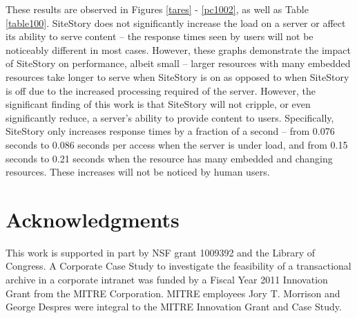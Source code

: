 \documentclass[runningheads,a4paper]{llncs}
\begin{document}
These results are observed in Figures \ref{tares} - \ref{pc1002}, as well as Table \ref{table100}. SiteStory does not significantly increase the load on a server or affect its ability to serve content -- the response times seen by users will not be noticeably different in most cases. However, these graphs demonstrate the impact of SiteStory on performance, albeit small -- larger resources with many embedded resources take longer to serve when SiteStory is on as opposed to when SiteStory is off due to the increased processing required of the server. However, the significant finding of this work is that SiteStory will not cripple, or even significantly reduce, a server's ability to provide content to users. Specifically, SiteStory only increases response times by a fraction of a second -- from 0.076 seconds to 0.086 seconds per access when the server is under load, and from 0.15 seconds to 0.21 seconds when the resource has many embedded and changing resources. These increases will not be noticed by human users.


\section{Acknowledgments}
\vskip -3mm
This work is supported in part by NSF grant 1009392 and the Library of Congress. A Corporate Case Study to investigate the feasibility of a transactional archive in a corporate intranet was funded by a Fiscal Year 2011 Innovation Grant from the MITRE Corporation. MITRE employees Jory T. Morrison and George Despres were integral to the MITRE Innovation Grant and Case Study.




\vskip -3mm

\end{document}
